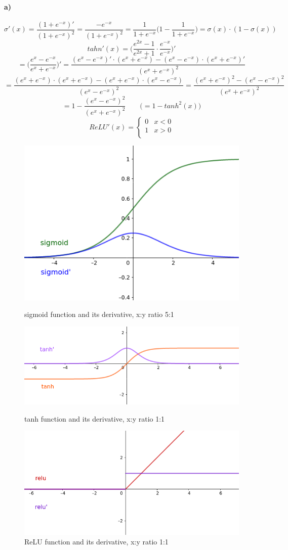 \begin{solution}
    \paragraph{a)}
    
    \[\sigma'(x) = \frac{(1+e^{-x})'}{(1+e^{-x})^2} = \frac{-e^{-x}}{(1+e^{-x})^2} = \frac{1}{1+e^{-x}} \big( 1 - \frac{1}{1+e^{-x}} \big) = \sigma(x) \cdot (1- \sigma(x))\]
    \[ tahn'(x) = \Big( \frac{e^{2x}-1}{e^{2x}+1} \cdot \frac{e^{-x}}{e^{-x}} \Big)' \]
    \[= \Big( \frac{e^x-e^{-x}}{e^x+e^{-x}} \Big)' = \frac{(e^x-e^{-x})'\cdot (e^x+e^{-x}) - (e^x-e^{-x})\cdot (e^x+e^{-x})' }{(e^x+e^{-x})^2} \]
    \[ = \frac{(e^x+e^{-x})\cdot (e^x+e^{-x}) - (e^x+e^{-x})\cdot (e^x-e^{-x}) }{(e^x-e^{-x})^2} = \frac{(e^x+e^{-x})^2 - (e^x-e^{-x})^2}{(e^x+e^{-x})^2} \]
    \[ = 1 - \frac{(e^x-e^{-x})^2}{(e^x+e^{-x})^2}\qquad \big(= 1 - tanh^2(x) \big)\]
    \[ReLU'(x) =   \left\{
    \begin{array}{ll}
          0 & x < 0 \\
          1 & x > 0 \\
    \end{array} 
    \right. \]
    
    \begin{figure}[ht]
        \center
        \includegraphics[width=0.4\linewidth]{img/fig_sig.png}
        \caption{sigmoid function and its derivative, x:y ratio 5:1 \label{fig:sigmoid}}
        \includegraphics[width=0.6\linewidth]{img/fig_tanh.png}
        \caption{tanh function and its derivative, x:y ratio 1:1 \label{fig:tanh}}
        \includegraphics[width=0.6\linewidth]{img/fig_relu.png}
        \caption{ReLU function and its derivative, x:y ratio 1:1 \label{fig:relu}}
    \end{figure}
    

\end{solution}
